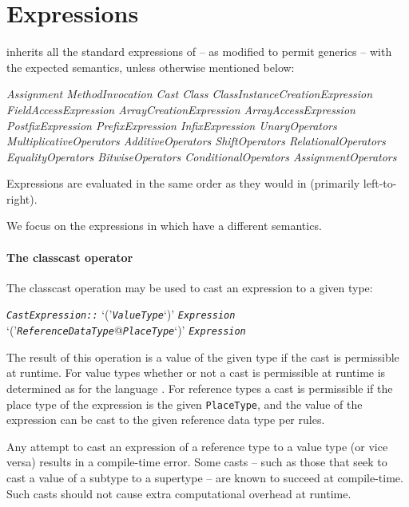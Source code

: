 \section{Expressions}\label{XtenExpressions}

{}\Xten{} inherits all the standard expressions of \Java{}
\cite[\S~15]{jls2} -- as modified to permit generics \cite{gjspec} --
with the expected semantics, unless otherwise mentioned below:

\begin{x10}
\em Assignment MethodInvocation 
\em Cast Class
\em ClassInstanceCreationExpression FieldAccessExpression   
\em ArrayCreationExpression ArrayAccessExpression
\em PostfixExpression PrefixExpression 
\em InfixExpression UnaryOperators
\em MultiplicativeOperators AdditiveOperators 
\em ShiftOperators RelationalOperators  
\em EqualityOperators BitwiseOperators
\em ConditionalOperators AssignmentOperators
\end{x10}

Expressions are evaluated in the same order as they would in \java{}
(primarily
left-to-right).\label{FieldAccess}\label{ClassCreation}\label{MethodInvocation}

We focus on the expressions in \Xten{} which have a different
semantics.

\paragraph{The classcast operator}\label{ClassCast}

The classcast operation may be used to cast an expression to a given type:

\begin{x10}
 {\em\tt{}CastExpression::}
   `('{\em\tt{}ValueType}`)' {\em\tt{}Expression}
   `('{\em\tt{}ReferenceDataType}@{\em\tt{}PlaceType}`)' {\em\tt{}Expression}
\end{x10}

The result of this operation is a value of the given type if the cast
is permissible at runtime. For value types whether or not a cast is
permissible at runtime is determined as for the \java{} language
{}\cite[\S 5.5]{jls2}. For reference types a cast is permissible if
the place type of the expression is the given {\tt PlaceType}, and the
value of the expression can be cast to the given reference data type
per \java{} rules.

Any attempt to cast an expression of a reference type to a value type
(or vice versa) results in a compile-time error. Some casts -- such as
those that seek to cast a value of a subtype to a supertype -- are
known to succeed at compile-time. Such casts should not cause extra
computational overhead at runtime.

